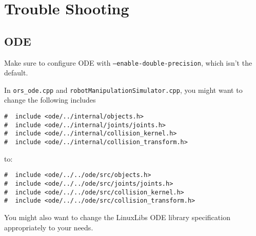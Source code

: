 \documentclass[10pt,twoside,twocolumn,fleqn]{article}
\begin{document}

\section{Trouble Shooting}

\subsection{ODE}

Make sure to configure ODE with \texttt{--enable-double-precision}, which isn't
the default.

In \texttt{ors\_ode.cpp} and \texttt{robotManipulationSimulator.cpp}, you
might want to change the following includes

\begin{lstlisting}
#  include <ode/../internal/objects.h>
#  include <ode/../internal/joints/joints.h>
#  include <ode/../internal/collision_kernel.h>
#  include <ode/../internal/collision_transform.h>
\end{lstlisting}

to:

\begin{lstlisting}
#  include <ode/../../ode/src/objects.h>
#  include <ode/../../ode/src/joints/joints.h>
#  include <ode/../../ode/src/collision_kernel.h>
#  include <ode/../../ode/src/collision_transform.h>
\end{lstlisting}

You might also want to change the LinuxLibs ODE library specification
appropriately to your needs.




\end{document}
